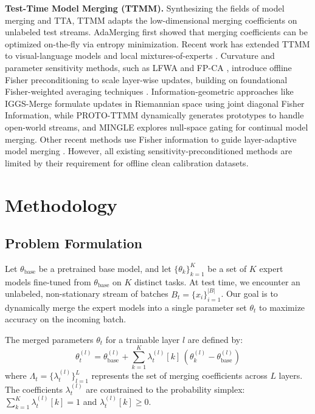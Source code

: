 \documentclass{article}
\theoremstyle{plain}
\theoremstyle{definition}
\begin{document}
\textbf{Test-Time Model Merging (TTMM).} Synthesizing the fields of model merging and TTA, TTMM adapts the low-dimensional merging coefficients on unlabeled test streams. AdaMerging \cite{adamerging} first showed that merging coefficients can be optimized on-the-fly via entropy minimization. Recent work has extended TTMM to visual-language models \cite{bertolissi2025_66} and local mixtures-of-experts \cite{imam2025_65}. Curvature and parameter sensitivity methods, such as LFWA and FP-CA \cite{fpca}, introduce offline Fisher preconditioning to scale layer-wise updates, building on foundational Fisher-weighted averaging techniques \cite{matena2021_91}. Information-geometric approaches like IGGS-Merge \cite{iggsmerge} formulate updates in Riemannian space using joint diagonal Fisher Information, while PROTO-TTMM \cite{protottmm} dynamically generates prototypes to handle open-world streams, and MINGLE \cite{qiu2025_67} explores null-space gating for continual model merging. Other recent methods use Fisher information to guide layer-adaptive model merging \cite{xia2026_90}. However, all existing sensitivity-preconditioned methods are limited by their requirement for offline clean calibration datasets.

\section{Methodology}
\label{submission-methodology}

\subsection{Problem Formulation}
Let $\theta_{\text{base}}$ be a pretrained base model, and let $\{\theta_k\}_{k=1}^K$ be a set of $K$ expert models fine-tuned from $\theta_{\text{base}}$ on $K$ distinct tasks. At test time, we encounter an unlabeled, non-stationary stream of batches $B_t = \{x_i\}_{i=1}^{|B|}$. Our goal is to dynamically merge the expert models into a single parameter set $\theta_t$ to maximize accuracy on the incoming batch.

The merged parameters $\theta_t$ for a trainable layer $l$ are defined by:
\begin{equation}
    \theta_t^{(l)} = \theta_{\text{base}}^{(l)} + \sum_{k=1}^K \lambda_t^{(l)}[k] \, (\theta_k^{(l)} - \theta_{\text{base}}^{(l)})
\end{equation}
where $\Lambda_t = \{\lambda_t^{(l)}\}_{l=1}^L$ represents the set of merging coefficients across $L$ layers. The coefficients $\lambda_t^{(l)}$ are constrained to the probability simplex: $\sum_{k=1}^K \lambda_t^{(l)}[k] = 1$ and $\lambda_t^{(l)}[k] \geq 0$.
\end{document}
